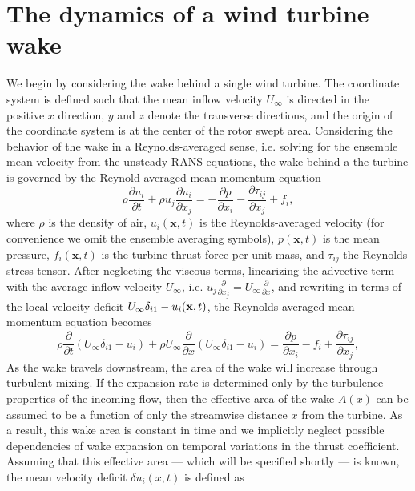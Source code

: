 \section{The dynamics of a wind turbine wake}
\label{sec:dynwake-wakemodel}
We begin by considering the wake behind a single wind turbine. The coordinate system is defined such that the mean inflow velocity $U_\infty$ is directed in the positive $x$ direction, $y$ and $z$ denote the transverse directions, and the origin of the coordinate system is at the center of the rotor swept area. Considering the behavior of the wake in a Reynolds-averaged sense, i.e. solving for the ensemble mean velocity from the unsteady RANS equations, the wake behind a the turbine is governed by the Reynold-averaged mean momentum equation
\begin{equation}
\rho \frac{\partial u_i}{\partial t} + \rho u_j \frac{\partial u_i}{\partial x_j} = - \frac{\partial p}{\partial x_i} - \frac{\partial \tau_{ij}}{\partial x_j} + f_i,
\end{equation}
where $\rho$ is the density of air, $u_i(\mathbf{x},t)$ is the Reynolds-averaged velocity (for convenience we omit the ensemble averaging symbols), $p(\mathbf{x},t)$ is the mean pressure, $f_i(\mathbf{x},t)$ is the turbine thrust force per unit mass, and $\tau_{ij}$ the Reynolds stress tensor.  After neglecting the viscous terms, linearizing the advective term with the average inflow velocity $U_\infty$, i.e. $u_j \frac{\partial }{\partial x_j} = U_\infty \frac{\partial}{\partial x}$, and rewriting in terms of the local velocity deficit $U_\infty\delta_{i1} - u_i({\bf x},t)$, the Reynolds averaged mean momentum equation becomes
%
\begin{equation}
\label{eq:linearized_momentum_deficit}
 \rho \frac{\partial}{\partial t} (U_\infty\delta_{i1} - u_i) +  \rho U_\infty \frac{\partial }{\partial x}  (U_\infty\delta_{i1} - u_i) = \frac{\partial p}{\partial x_i} - f_i + \frac{\partial \tau_{ij}}{\partial x_j},
\end{equation}
As the wake travels downstream, the area of the wake will increase through turbulent mixing. If the expansion rate is determined only by the turbulence properties of the incoming flow, then the effective area of the wake $A(x)$ can be assumed to be a function of only the streamwise distance $x$ from the turbine. As a result, this wake area is constant in time and we implicitly neglect possible dependencies of wake expansion on temporal variations in the thrust coefficient.  Assuming that this effective area --- which will be specified shortly --- is known, the mean velocity deficit $\delta u_i(x,t)$ is defined as

